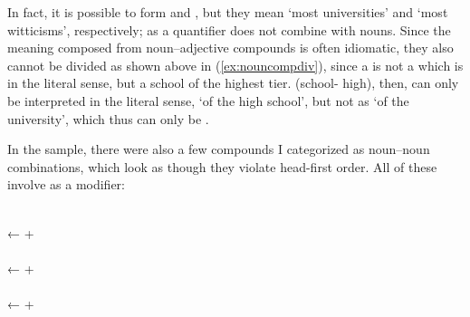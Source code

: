 \xe

In fact, it is possible to form  and 
, but they mean `most universities' and `most
witticisms', respectively;  as a quantifier does not
combine with nouns. Since the meaning composed from noun--adjective compounds
is often idiomatic, they also cannot be divided as shown above in
(\ref{ex:nouncompdiv}), since a  is not
a  which is  in the literal
sense, but a school of the highest tier. 
(school-\Gen{} high), then, can only be interpreted in the literal sense, `of
the high school', but not as `of the university', which thus can only be
.

In the sample, there were also a few compounds I categorized as noun--noun 
combinations, which look as though they violate head-first order. All of these 
involve  as a modifier:

\pex
	\a {} \\
		← 
		+ 
		\\
	\a {} \\
		← 
		+ 
		\\
	\a {} \\
		← 
		+ 
\xe

